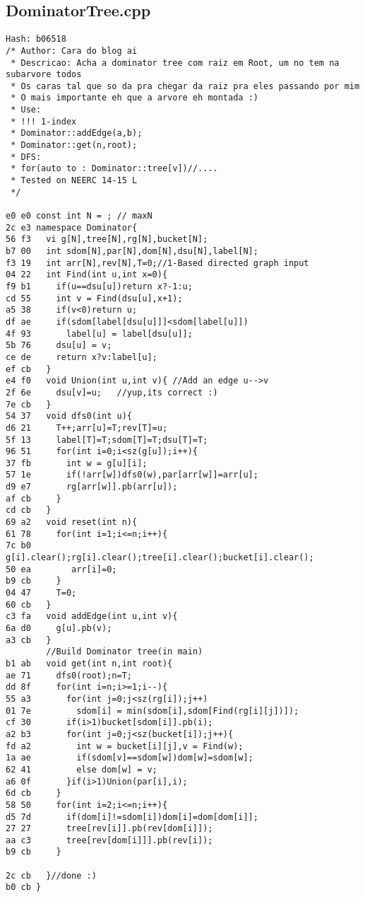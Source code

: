 \documentclass[11pt, a4paper, twoside]{article}
\begin{document}
\subsection{DominatorTree.cpp}
\begin{lstlisting}
Hash: b06518
/* Author: Cara do blog ai
 * Descricao: Acha a dominator tree com raiz em Root, um no tem na subarvore todos
 * Os caras tal que so da pra chegar da raiz pra eles passando por mim
 * O mais importante eh que a arvore eh montada :)
 * Use:
 * !!! 1-index
 * Dominator::addEdge(a,b);
 * Dominator::get(n,root);
 * DFS:
 * for(auto to : Dominator::tree[v])//....
 * Tested on NEERC 14-15 L
 */

e0 e0 const int N = ; // maxN
2c e3 namespace Dominator{
56 f3   vi g[N],tree[N],rg[N],bucket[N];
b7 00   int sdom[N],par[N],dom[N],dsu[N],label[N];
f3 19   int arr[N],rev[N],T=0;//1-Based directed graph input
04 22   int Find(int u,int x=0){
f9 b1     if(u==dsu[u])return x?-1:u;
cd 55     int v = Find(dsu[u],x+1);
a5 38     if(v<0)return u;
df ae     if(sdom[label[dsu[u]]]<sdom[label[u]])
4f 93       label[u] = label[dsu[u]];
5b 76     dsu[u] = v;
ce de     return x?v:label[u];
ef cb   }
e4 f0   void Union(int u,int v){ //Add an edge u-->v
2f 6e     dsu[v]=u;   //yup,its correct :)
7e cb   }
54 37   void dfs0(int u){
d6 21     T++;arr[u]=T;rev[T]=u;
5f 13     label[T]=T;sdom[T]=T;dsu[T]=T;
96 51     for(int i=0;i<sz(g[u]);i++){
37 fb       int w = g[u][i];
57 1e       if(!arr[w])dfs0(w),par[arr[w]]=arr[u];
d9 e7       rg[arr[w]].pb(arr[u]);
af cb     }
cd cb   }
69 a2   void reset(int n){
61 78     for(int i=1;i<=n;i++){
7c b0       g[i].clear();rg[i].clear();tree[i].clear();bucket[i].clear();
50 ea 	     arr[i]=0;
b9 cb     }
04 47     T=0;
60 cb   }
c3 fa   void addEdge(int u,int v){
6a d0     g[u].pb(v);
a3 cb   }
        //Build Dominator tree(in main)
b1 ab   void get(int n,int root){
ae 71     dfs0(root);n=T;
dd 8f     for(int i=n;i>=1;i--){
55 a3       for(int j=0;j<sz(rg[i]);j++)
01 7e         sdom[i] = min(sdom[i],sdom[Find(rg[i][j])]);
cf 30       if(i>1)bucket[sdom[i]].pb(i);
a2 b3       for(int j=0;j<sz(bucket[i]);j++){
fd a2         int w = bucket[i][j],v = Find(w);
1a ae         if(sdom[v]==sdom[w])dom[w]=sdom[w];
62 41         else dom[w] = v;
a6 0f       }if(i>1)Union(par[i],i);
6d cb     }
58 50     for(int i=2;i<=n;i++){
d5 7d       if(dom[i]!=sdom[i])dom[i]=dom[dom[i]];
27 27       tree[rev[i]].pb(rev[dom[i]]);
aa c3       tree[rev[dom[i]]].pb(rev[i]);
b9 cb     }
         
2c cb   }//done :) 
b0 cb }
\end{lstlisting}
\end{document}

